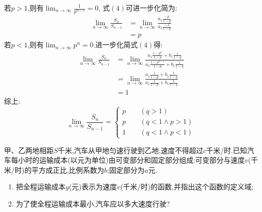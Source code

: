 \documentclass[answers]{exam}
\begin{document}
\begin{questions}
\begin{solution}
		若$p>1$,则有$\displaystyle\lim_{n\to\infty}\frac{1}{p^{n-1}} = 0$, 式$(4)$可进一步化简为:
		\begin{align*}
			\lim_{n\to\infty}\frac{S_n}{S_{n-1}} & = \lim_{n\to\infty}\frac{a_1\frac{-p}{1-p}}{a_1\frac{-1}{1-p}} \\
			                                     & = p
		\end{align*}
		若$p<1$,则有$\displaystyle\lim_{n\to\infty}p^n=0$.进一步化简式$(4)$得:
		\begin{align*}
			\lim_{n\to\infty}\frac{S_n}{S_{n-1}} & =
			\lim_{n\to\infty}\frac{a_1\frac{1-p^n}{1-p} + b_1\frac{1}{1-q}}{a_1\frac{1-p^{n-1}}{1-p} + b_1\frac1{1-q}}
			\\
			                                     & = \lim_{n\to\infty}\frac{a_1\frac{1}{1-p}
			+b_1\frac1{1-q}}{a_1\frac{1}{1-p} + b_1\frac1{1-q}}                              \\
			                                     & = 1
		\end{align*}
		综上:
		\begin{equation*}
			\lim_{n\to\infty}\frac{S_n}{S_{n-1}}  =
			\begin{cases}
				p \qquad (q >1)              \\
				p \qquad (q < 1 \land p > 1) \\
				1 \qquad (q < 1 \land p < 1)
			\end{cases}
		\end{equation*}
	\end{solution}

	\question
	甲、乙两地相距$S$千米,汽车从甲地匀速行驶到乙地,速度不得超过$c$千米/时.已知汽车每小时的运输成本(以元为单位)由可变部分和固定部分组成:可变部分与速度$v$(千米/时)的平方成正比,比例系数为$b$;固定部分为$a$元.
	\begin{enumerate}[label=(\arabic*)]
		\item 把全程运输成本$y$(元)表示为速度$v$(千米/时)的函数,并指出这个函数的定义域;
		\item 为了使全程运输成本最小,汽车应以多大速度行驶?
	\end{enumerate}


\end{questions}
\end{document}
